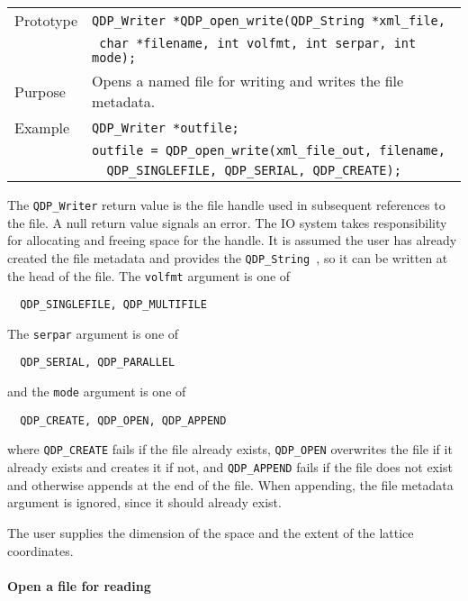 \documentclass{article}
\newcommand{\QMDhandle}{{\tt QDP\_String }}
\begin{document}
\begin{flushleft}
  \begin{tabular}{|l|l|}
  \hline
  Prototype      & \verb|QDP_Writer *QDP_open_write(|\QMDhandle \verb|*xml_file,|\\
                 & \verb| char *filename, int volfmt, int serpar, int mode);| \\
    \hline
  Purpose        & Opens a named file for writing and writes the file metadata. \\
\hline
  Example  & \verb|QDP_Writer *outfile;| \\
           & \verb|outfile = QDP_open_write(xml_file_out, filename, |\\
	   & \verb|  QDP_SINGLEFILE, QDP_SERIAL, QDP_CREATE); |\\
   \hline
 \end{tabular}
\end{flushleft}
%
The \verb|QDP_Writer| return value is the file handle used in
subsequent references to the file.  A null return value signals an
error. The IO system takes responsibility for allocating and freeing
space for the handle.  It is assumed the user has already created the
file metadata and provides the \QMDhandle, so it can be written
at the head of the file.  The \verb|volfmt| argument is one of
%
\begin{verbatim}
  QDP_SINGLEFILE, QDP_MULTIFILE
\end{verbatim}
%
The \verb|serpar| argument is one of
%
\begin{verbatim}
  QDP_SERIAL, QDP_PARALLEL
\end{verbatim}
%
and the \verb|mode| argument is one of
%
\begin{verbatim}
  QDP_CREATE, QDP_OPEN, QDP_APPEND
\end{verbatim}
%
where \verb|QDP_CREATE| fails if the file already exists,
\verb|QDP_OPEN| overwrites the file if it already exists and creates
it if not, and \verb|QDP_APPEND| fails if the file does not exist and
otherwise appends at the end of the file.  When appending, the file
metadata argument is ignored, since it should already exist.

The user supplies the dimension of the space and the extent of the
lattice coordinates.

\paragraph{Open a file for reading}
\end{document}
